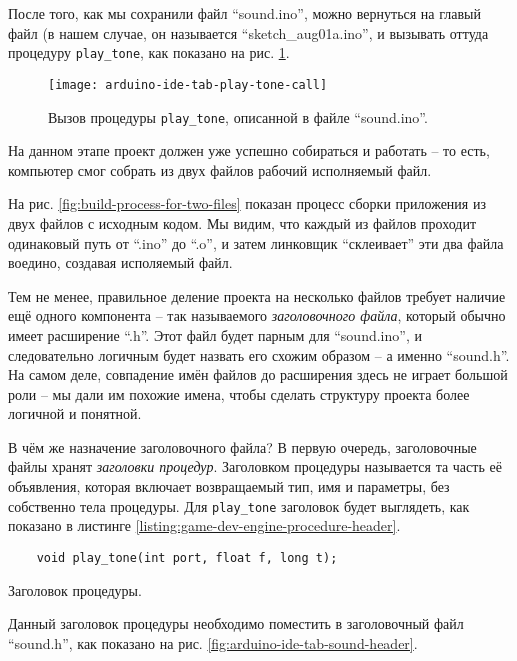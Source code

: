 \documentclass[../sparc.tex]{subfiles}
\begin{document}
После того, как мы сохранили файл ``sound.ino'', можно вернуться на главый файл
(в нашем случае, он называется ``sketch\_aug01a.ino'', и вызывать оттуда
процедуру \texttt{play_tone}, как показано на
рис. \ref{fig:arduino-ide-tab-play-tone-call}.

\begin{figure}[H]
  \centering
  \texttt{[image: arduino-ide-tab-play-tone-call]}
  \caption{Вызов процедуры \texttt{play_tone}, описанной в файле
    ``sound.ino''.}
  \label{fig:arduino-ide-tab-play-tone-call}
\end{figure}

На данном этапе проект должен уже успешно собираться и работать -- то есть,
компьютер смог собрать из двух файлов рабочий исполняемый файл.


На рис. \ref{fig:build-process-for-two-files} показан процесс сборки приложения
из двух файлов с исходным кодом.  Мы видим, что каждый из файлов проходит
одинаковый путь от ``.ino'' до ``.o'', и затем линковщик ``склеивает'' эти два
файла воедино, создавая исполяемый файл.

Тем не менее, правильное деление проекта на несколько файлов требует наличие ещё
одного компонента -- так называемого \emph{заголовочного файла}, который обычно
имеет расширение ``.h''.  Этот файл будет парным для ``sound.ino'', и
следовательно логичным будет назвать его схожим образом -- а именно ``sound.h''.
На самом деле, совпадение имён файлов до расширения здесь не играет большой роли
-- мы дали им похожие имена, чтобы сделать структуру проекта более логичной и
понятной.

В чём же назначение заголовочного файла?  В первую очередь, заголовочные файлы
хранят \emph{заголовки процедур}.  Заголовком процедуры называется та часть её
объявления, которая включает возвращаемый тип, имя и параметры, без собственно
тела процедуры.  Для \texttt{play_tone} заголовок будет выглядеть, как
показано в листинге \ref{listing:game-dev-engine-procedure-header}.

\begin{listing}[H]
  \begin{verbatim}
    void play_tone(int port, float f, long t);
  \end{verbatim}
  \label{listing:game-dev-engine-procedure-header}
  \caption{Заголовок процедуры.}
\end{listing}

Данный заголовок процедуры необходимо поместить в заголовочный файл ``sound.h'',
как показано на рис. \ref{fig:arduino-ide-tab-sound-header}.
\end{document}

